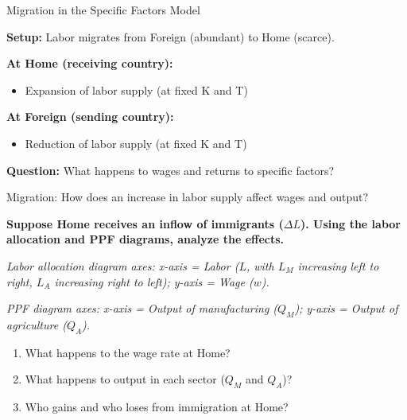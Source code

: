 \documentclass{beamer}
\begin{document}

\begin{frame}{Migration in the Specific Factors Model}

\textbf{Setup:} Labor migrates from Foreign (abundant) to Home (scarce).

\vspace{0.3cm}

\textbf{At Home (receiving country):}
\begin{itemize}
    \item Expansion of labor supply (at fixed K and T)
\end{itemize}

\textbf{At Foreign (sending country):}
\begin{itemize}
    \item Reduction of labor supply (at fixed K and T)
\end{itemize}

\vspace{0.3cm}

\textbf{Question:} What happens to wages and returns to specific factors?

\end{frame}


\begin{frame}{Migration: How does an increase in labor supply affect wages and output?}

\textbf{Suppose Home receives an inflow of immigrants ($\Delta L$). Using the labor allocation and PPF diagrams, analyze the effects.}

\vspace{0.2cm}

\textit{Labor allocation diagram axes: x-axis = Labor ($L$, with $L_M$ increasing left to right, $L_A$ increasing right to left); y-axis = Wage ($w$).}

\vspace{0.1cm}

\textit{PPF diagram axes: x-axis = Output of manufacturing ($Q_M$); y-axis = Output of agriculture ($Q_A$).}

\vspace{0.3cm}

\begin{enumerate}
    \item What happens to the wage rate at Home?
    \item What happens to output in each sector ($Q_M$ and $Q_A$)?
    \item Who gains and who loses from immigration at Home?
\end{enumerate}

\end{frame}
\end{document}
